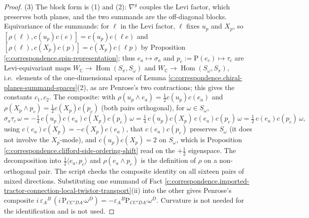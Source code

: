 \documentclass[11pt]{article}
\theoremstyle{definition}
\theoremstyle{plain}
\providecommand{\C}{}\renewcommand{\C}{\mathbb{C}}
\providecommand{\Som}{}\renewcommand{\Som}{S_\omega}
\providecommand{\Spi}{}\renewcommand{\Spi}{S_\pi}
\providecommand{\ip}{}\renewcommand{\ip}[2]{\langle #1, #2\rangle}
\begin{document}
\begin{proof}
(3) The block form is (1) and (2): $\nabla^g$ couples the Levi factor, which preserves both planes, and the two summands are the off-diagonal blocks. Equivariance of the summands: for $\ell$ in the Levi factor, $\ell$ fixes $u_p$ and $X_p$, so $[\rho(\ell), c(u_p)c(e)] = c(u_p)c(\ell e)$ and $[\rho(\ell), c(X_p)c(p)] = c(X_p)c(\ell p)$ by Proposition \ref{c:correspondence.spin-representation}; thus $e_a \mapsto \sigma_a$ and $p_c := \mathrm{P}(e_c) \mapsto \tau_c$ are Levi-equivariant maps $W_\C \to \operatorname{Hom}(\Spi,\Som)$ and $W_\C\to\operatorname{Hom}(\Som,\Spi)$, i.e.\ elements of the one-dimensional spaces of Lemma \ref{c:correspondence.chiral-planes-summand-spaces}(2), as are Penrose's two contractions; this gives the constants $c_1, c_2$. The composite: with $\rho(u_p\wedge e_a) = \tfrac12 c(u_p)c(e_a)$ and $\rho(X_p\wedge p_c) = \tfrac12 c(X_p)c(p_c)$ (both pairs orthogonal), for $\omega \in \Som$,
\[
\sigma_a\tau_c\,\omega = -\tfrac14\,c(u_p)c(e_a)c(X_p)c(p_c)\,\omega = \tfrac14\,c(u_p)c(X_p)\,c(e_a)c(p_c)\,\omega = \tfrac12\,c(e_a)c(p_c)\,\omega ,
\]
using $c(e_a)c(X_p) = -c(X_p)c(e_a)$, that $c(e_a)c(p_c)$ preserves $\Som$ (it does not involve the $X_p$-mode), and $c(u_p)c(X_p) = 2$ on $\Som$, which is Proposition \ref{c:correspondence.clifford-side-ordering-shift} read on the $+\tfrac12$ eigenspace. The decomposition into $\tfrac12\ip{e_a}{p_c}$ and $\rho(e_a\wedge p_c)$ is the definition of $\rho$ on a non-orthogonal pair. The script checks the composite identity on all sixteen pairs of mixed directions. Substituting one summand of Fact \ref{c:correspondence.imported-tractor-connection-local-twistor-transport}(ii) into the other gives Penrose's composite $i\,\varepsilon_A{}^B\,(i\,\mathrm{P}_{CC'DA'}\omega^D) = -\varepsilon_A{}^B\mathrm{P}_{CC'DA'}\omega^D$. Curvature is not needed for the identification and is not used.

\end{proof}
\end{document}
